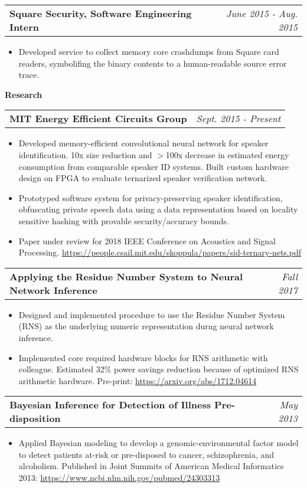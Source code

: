 \documentclass[letterpaper,11pt]{article}
\makeatletter
\newcommand{\resitem}[1]{\item[--] #1 \vspace{-4pt}}
\newcommand{\ressubheadingtwo}[2] {
\begin{tabular*}{7in}{l@{\extracolsep{\fill}}r}
	\textbf{#1} & \textit{#2} \\
\end{tabular*}\vspace{-6pt}}
\makeatother
\begin{document}
    \vspace{0.05in}

    \vspace{0.05in}
	\ressubheadingtwo{Square Security, Software Engineering Intern}{June 2015 - Aug. 2015}
	\begin{itemize}
            \resitem{Developed service to collect memory core crashdumps from Square card readers, symbolifing the binary contents to a human-readable source error trace.}
	\end{itemize}

    \vspace{0.05in}

\large \textbf{Research \vspace{1mm}} \normalsize
    \vspace{0.05in}

	\ressubheadingtwo{MIT Energy Efficient Circuits Group}{Sept. 2015 - Present}{}
	\begin{itemize}
            \resitem{Developed memory-efficient convolutional neural network for speaker identification. 10x size reduction and $>$100x decrease in estimated energy consumption from comparable speaker ID systems. Built custom hardware design on FPGA to evaluate ternarized speaker verification network.}
            \resitem{Prototyped software system for privacy-preserving speaker identification, obfuscating private speech data using a data representation based on locality sensitive hashing with provable security/accuracy bounds.}
            \resitem{Paper under review for 2018 IEEE Conference on Acoustics and Signal Processing. \url{https://people.csail.mit.edu/skoppula/papers/sid-ternary-nets.pdf} }
	\end{itemize}

    \ressubheadingtwo{Applying the Residue Number System to Neural Network Inference}{Fall 2017}{}
	\begin{itemize}
            \resitem{Designed and implemented procedure to use the Residue Number System (RNS) as the underlying numeric representation durng neural network inference.}
            \resitem{Implemented core required hardware blocks for RNS arithmetic with colleague. Estimated 32\% power savings reduction because of optimized RNS arithmetic hardware. Pre-print: \url{https://arxiv.org/abs/1712.04614}}
	\end{itemize}


    \ressubheadingtwo{Bayesian Inference for Detection of Illness Pre-disposition}{May 2013}{}
	\begin{itemize}
            \resitem{Applied Bayesian modeling to develop a genomic-environmental factor model to detect patients at-risk or pre-disposed to cancer, schizophrenia, and alcoholism. Published in Joint Summits of American Medical Informatics 2013: \url{https://www.ncbi.nlm.nih.gov/pubmed/24303313}}
	\end{itemize}
\end{document}
